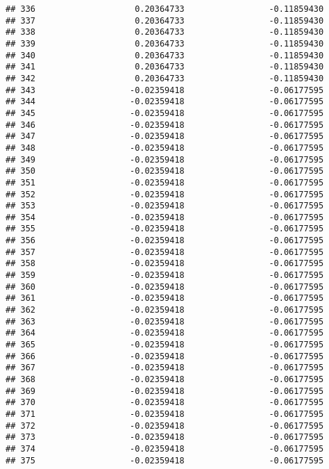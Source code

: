 \documentclass[]{article}
\begin{document}
\begin{verbatim}
## 336                    0.20364733                 -0.11859430
## 337                    0.20364733                 -0.11859430
## 338                    0.20364733                 -0.11859430
## 339                    0.20364733                 -0.11859430
## 340                    0.20364733                 -0.11859430
## 341                    0.20364733                 -0.11859430
## 342                    0.20364733                 -0.11859430
## 343                   -0.02359418                 -0.06177595
## 344                   -0.02359418                 -0.06177595
## 345                   -0.02359418                 -0.06177595
## 346                   -0.02359418                 -0.06177595
## 347                   -0.02359418                 -0.06177595
## 348                   -0.02359418                 -0.06177595
## 349                   -0.02359418                 -0.06177595
## 350                   -0.02359418                 -0.06177595
## 351                   -0.02359418                 -0.06177595
## 352                   -0.02359418                 -0.06177595
## 353                   -0.02359418                 -0.06177595
## 354                   -0.02359418                 -0.06177595
## 355                   -0.02359418                 -0.06177595
## 356                   -0.02359418                 -0.06177595
## 357                   -0.02359418                 -0.06177595
## 358                   -0.02359418                 -0.06177595
## 359                   -0.02359418                 -0.06177595
## 360                   -0.02359418                 -0.06177595
## 361                   -0.02359418                 -0.06177595
## 362                   -0.02359418                 -0.06177595
## 363                   -0.02359418                 -0.06177595
## 364                   -0.02359418                 -0.06177595
## 365                   -0.02359418                 -0.06177595
## 366                   -0.02359418                 -0.06177595
## 367                   -0.02359418                 -0.06177595
## 368                   -0.02359418                 -0.06177595
## 369                   -0.02359418                 -0.06177595
## 370                   -0.02359418                 -0.06177595
## 371                   -0.02359418                 -0.06177595
## 372                   -0.02359418                 -0.06177595
## 373                   -0.02359418                 -0.06177595
## 374                   -0.02359418                 -0.06177595
## 375                   -0.02359418                 -0.06177595

\end{verbatim}
\end{document}
